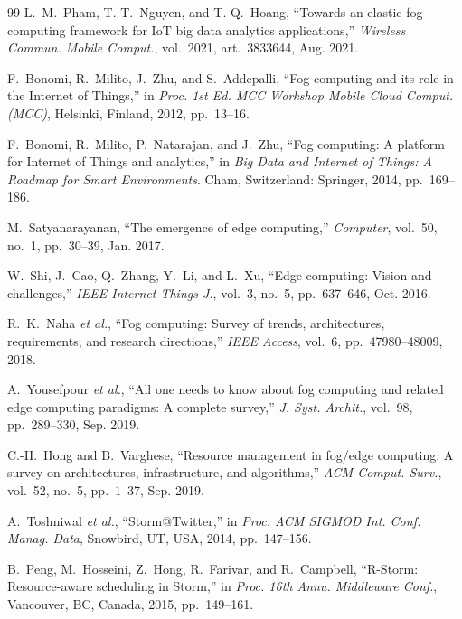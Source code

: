 \documentclass[conference]{IEEEtran}
\begin{document}
\begin{thebibliography}{99}
L.~M.~Pham, T.-T.~Nguyen, and T.-Q.~Hoang,
``Towards an elastic fog-computing framework for IoT big data analytics
applications,''
\emph{Wireless Commun. Mobile Comput.}, vol.~2021, art.~3833644, Aug. 2021.

F.~Bonomi, R.~Milito, J.~Zhu, and S.~Addepalli,
``Fog computing and its role in the Internet of Things,''
in \emph{Proc. 1st Ed. MCC Workshop Mobile Cloud Comput. (MCC)},
Helsinki, Finland, 2012, pp.~13--16.

F.~Bonomi, R.~Milito, P.~Natarajan, and J.~Zhu,
``Fog computing: A platform for Internet of Things and analytics,''
in \emph{Big Data and Internet of Things: A Roadmap for Smart Environments}.
Cham, Switzerland: Springer, 2014, pp.~169--186.

M.~Satyanarayanan,
``The emergence of edge computing,''
\emph{Computer}, vol.~50, no.~1, pp.~30--39, Jan. 2017.

W.~Shi, J.~Cao, Q.~Zhang, Y.~Li, and L.~Xu,
``Edge computing: Vision and challenges,''
\emph{IEEE Internet Things J.}, vol.~3, no.~5, pp.~637--646, Oct. 2016.

R.~K.~Naha \emph{et al.},
``Fog computing: Survey of trends, architectures, requirements, and research
directions,''
\emph{IEEE Access}, vol.~6, pp.~47980--48009, 2018.

A.~Yousefpour \emph{et al.},
``All one needs to know about fog computing and related edge computing paradigms:
A complete survey,''
\emph{J. Syst. Archit.}, vol.~98, pp.~289--330, Sep. 2019.

C.-H.~Hong and B.~Varghese,
``Resource management in fog/edge computing: A survey on architectures,
infrastructure, and algorithms,''
\emph{ACM Comput. Surv.}, vol.~52, no.~5, pp.~1--37, Sep. 2019.

A.~Toshniwal \emph{et al.},
``Storm@Twitter,''
in \emph{Proc. ACM SIGMOD Int. Conf. Manag. Data}, Snowbird, UT, USA,
2014, pp.~147--156.

B.~Peng, M.~Hosseini, Z.~Hong, R.~Farivar, and R.~Campbell,
``R-Storm: Resource-aware scheduling in Storm,''
in \emph{Proc. 16th Annu. Middleware Conf.}, Vancouver, BC, Canada,
2015, pp.~149--161.


\end{thebibliography}
\end{document}

